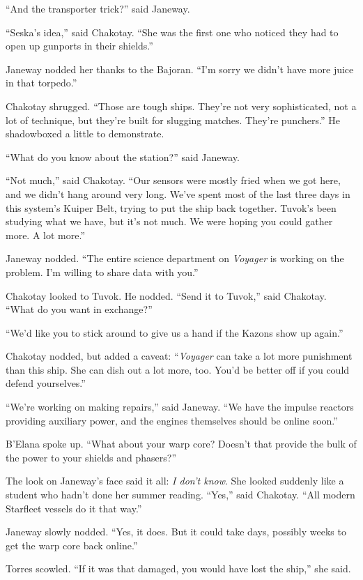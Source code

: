 \documentclass[twoside,letterpaper,12pt]{memoir}
\begin{document}
``And the transporter trick?'' said Janeway.

``Seska's idea,'' said Chakotay. ``She was the first one who noticed they had to open up gunports in their shields.''

Janeway nodded her thanks to the Bajoran. ``I'm sorry we didn't have more juice in that torpedo.''

Chakotay shrugged. ``Those are tough ships. They're not very sophisticated, not a lot of technique, but they're built for slugging matches. They're punchers.'' He shadowboxed a little to demonstrate.

``What do you know about the station?'' said Janeway.

``Not much,'' said Chakotay. ``Our sensors were mostly fried when we got here, and we didn't hang around very long. We've spent most of the last three days in this system's Kuiper Belt, trying to put the ship back together. Tuvok's been studying what we have, but it's not much. We were hoping you could gather more. A lot more.''

Janeway nodded. ``The entire science department on \textit{Voyager} is working on the problem. I'm willing to share data with you.''

Chakotay looked to Tuvok. He nodded. ``Send it to Tuvok,'' said Chakotay. ``What do you want in exchange?''

``We'd like you to stick around to give us a hand if the Kazons show up again.''

Chakotay nodded, but added a caveat: ``\textit{Voyager} can take a lot more punishment than this ship. She can dish out a lot more, too. You'd be better off if you could defend yourselves.''

``We're working on making repairs,'' said Janeway. ``We have the impulse reactors providing auxiliary power, and the engines themselves should be online soon.''

B'Elana spoke up. ``What about your warp core? Doesn't that provide the bulk of the power to your shields and phasers?''

The look on Janeway's face said it all: \textit{I don't know}. She looked suddenly like a student who hadn't done her summer reading. ``Yes,'' said Chakotay. ``All modern Starfleet vessels do it that way.''

Janeway slowly nodded. ``Yes, it does. But it could take days, possibly weeks to get the warp core back online.''

Torres scowled. ``If it was that damaged, you would have lost the ship,'' she said.
\end{document}
